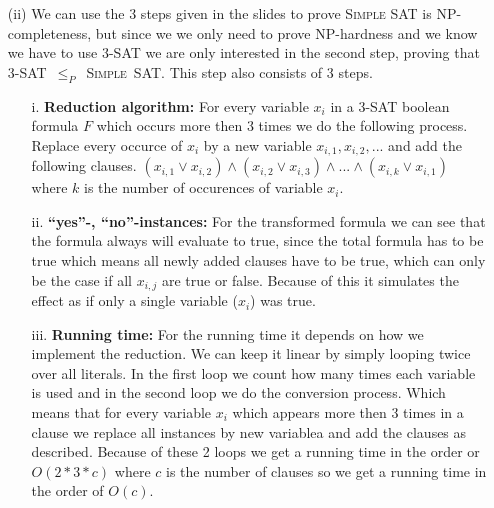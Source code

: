 \documentclass{article}
\begin{document}
\begin{itemize}
\begin{itemize}
\item[(ii)] We can use the 3 steps given in the slides to prove \textsc{Simple SAT} is \textsc{NP}-completeness, but since we we only need to prove NP-hardness and we know we have to use \textsc{3-SAT} we are only interested in the second step, proving that \textsc{3-SAT}~$\le_P$~\textsc{Simple~SAT}. This step also consists of 3 steps.

\begin{itemize}

\item[i.] \textbf{Reduction algorithm:} For every variable $x_i$ in a \textsc{3-SAT} boolean formula $F$ which occurs more then 3 times we do the following process. Replace every occurce of $x_i$ by a new variable $x_{i,1},x_{i,2},...$ and add the following clauses. $(x_{i,1} \vee x_{i,2}) \wedge(x_{i,2} \vee x_{i,3}) \wedge ... \wedge (x_{i,k} \vee x_{i,1})$ where $k$ is the number of occurences of variable $x_i$.

\item[ii.] \textbf{``yes''-, ``no''-instances:} For the transformed formula we can see that the formula always will evaluate to true, since the total formula has to be true which means all newly added clauses have to be true, which can only be the case if all $x_{i,j}$ are true or false. Because of this it simulates the effect as if only a single variable ($x_i$) was true.

\item[iii.] \textbf{Running time:} For the running time it depends on how we implement the reduction. We can keep it linear by simply looping twice over all literals. In the first loop we count how many times each variable is used and in the second loop we do the conversion process. Which means that for every variable $x_i$ which appears more then 3 times in a clause we replace all instances by new variablea and add the clauses as described. Because of these 2 loops we get a running time in the order or $O(2*3*c)$ where $c$ is the number of clauses so we get a running time in the order of $O(c)$.

\end{itemize}
\end{itemize}

\end{itemize}
\end{document}
